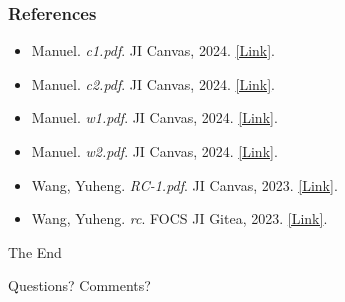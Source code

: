 \documentclass[
	11pt, %
]{beamer}
\begin{document}
\begin{frame} %
	\frametitle{References}
	
	\begin{itemize}
    \item Manuel. \textit{c1.pdf}. JI Canvas, 2024. \href{https://jicanvas.com/courses/917/files/folder/lectures?preview=333611}{[Link]}.

    \item Manuel. \textit{c2.pdf}. JI Canvas, 2024. \href{https://jicanvas.com/courses/917/files/folder/lectures?preview=333612}{[Link]}.

    \item Manuel. \textit{w1.pdf}. JI Canvas, 2024. \href{https://jicanvas.com/courses/917/files/folder/worksheets?preview=333629}{[Link]}.

    \item Manuel. \textit{w2.pdf}. JI Canvas, 2024. \href{https://jicanvas.com/courses/917/files/folder/worksheets?preview=333630}{[Link]}.

    \item Wang, Yuheng. \textit{RC-1.pdf}. JI Canvas, 2023. \href{https://jicanvas.com/courses/489/files/folder/rc?preview=223833}{[Link]}.

    \item Wang, Yuheng. \textit{rc}. FOCS JI Gitea, 2023. \href{https://focs.ji.sjtu.edu.cn/git/engr151-23fa/course-support/src/branch/master/rc}{[Link]}.
\end{itemize}
\end{frame}


\begin{frame}[plain] %
	\begin{center}
		{\Huge The End}
		
		\bigskip\bigskip %
		
		{\LARGE Questions? Comments?}
	\end{center}
\end{frame}

\end{document}
